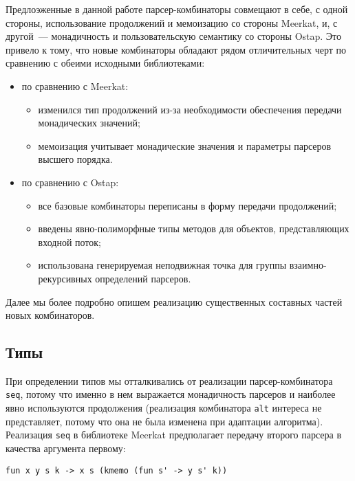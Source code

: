 \documentclass[conference]{IEEEtran}
\begin{document}
Предлоэженные в данной работе парсер-комбинаторы совмещают в себе, с одной стороны, использование продолжений и мемоизацию со стороны Meerkat, и, с другой~--- монадичность и пользовательскую семантику со стороны Ostap.
Это привело к тому, что новые комбинаторы обладают рядом отличительных черт по сравнению с обеими исходными библиотеками:

\begin{itemize}
\item по сравнению с Meerkat:

\begin{itemize}
\item изменился тип продолжений из-за необходимости обеспечения передачи монадических значений;
\item мемоизация учитывает монадические значения и параметры парсеров высшего порядка.
\end{itemize}

\item по сравнению с Ostap:

\begin{itemize}
\item все базовые комбинаторы переписаны в форму передачи продолжений;
\item введены явно-полиморфные типы методов для объектов, представляющих входной поток;
\item использована генерируемая неподвижная точка для группы взаимно-рекурсивных определений парсеров.
\end{itemize}
\end{itemize}

Далее мы более подробно опишем реализацию существенных составных частей новых комбинаторов.

\subsection{Типы}

При определении типов мы отталкивались от реализации парсер-комбинатора \lstinline|seq|, потому что именно в нем выражается монадичность парсеров и наиболее явно используются продолжения
(реализация комбинатора \lstinline|alt| интереса не представляет, потому что она не была изменена при адаптации алгоритма). Реализация \lstinline|seq| в библиотеке Meerkat
предполагает передачу второго парсера в качества аргумента первому:

\begin{lstlisting}[basicstyle=\small]
   fun x y s k -> x s (kmemo (fun s' -> y s' k))
\end{lstlisting}
\end{document}
